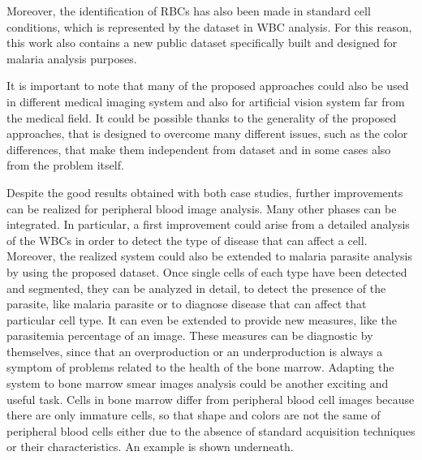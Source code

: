 \documentclass[final,a4paper,12pt,english]{UnicaPhdThesis3}
\begin{document}
{Moreover, the identification of RBCs has also been made in standard cell conditions, which is represented by the dataset in WBC analysis. For this reason, this work also contains a new public dataset specifically built and designed for malaria analysis purposes.

It is important to note that many of the proposed approaches could also be used in different medical imaging system and also for artificial vision system far from the medical field. It could be possible thanks to the generality of the proposed approaches, that is designed to overcome many different issues, such as the color differences, that make them independent from dataset and in some cases also from the problem itself.

Despite the good results obtained with both case studies, further improvements can be realized for peripheral blood image analysis. Many other phases can be integrated. 
In particular, a first improvement could arise from a detailed analysis of the WBCs in order to detect the type of disease that can affect a cell. 
Moreover, the realized system could also be extended to malaria parasite analysis by using the proposed dataset. Once single cells of each type have been detected and segmented, they can be analyzed in detail, to detect the presence of the parasite, like malaria parasite or to diagnose disease that can affect that particular cell type.   
It can even be extended to provide new measures, like the parasitemia percentage of an image.
These measures can be diagnostic by themselves, since that an overproduction or an underproduction is always a symptom of problems related to the health of the bone marrow. Adapting the system to bone marrow smear images analysis could be another exciting and useful task. Cells in bone marrow differ from peripheral blood cell images because there are only immature cells, so that shape and colors are not the same of peripheral blood cells either due to the absence of standard acquisition techniques or their characteristics. An example is shown underneath.

}
\end{document}
